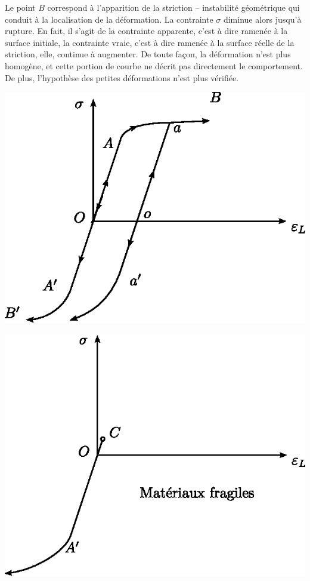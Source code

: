 Le point $B$ correspond à l'apparition de la striction -- instabilité géométrique qui conduit à la localisation de la déformation.
La contrainte $\sigma$ diminue alors jusqu'à rupture.
En fait, il s'agit de la contrainte apparente, c'est à dire ramenée à la surface initiale, la contrainte vraie, c'est à dire ramenée à la surface réelle de la striction, elle, continue à augmenter.
De toute façon, la déformation n'est plus homogène, et cette portion de courbe ne décrit pas directement le comportement.
De plus, l'hypothèse des petites déformations n'est plus vérifiée.
\begin{multicols}{2}
    \begin{center}
        \includegraphics{../images/T1_Ch04-0013}
    \end{center}
    \columnbreak
    \begin{center}
        \includegraphics{../images/T1_Ch04-0014}
    \end{center}
\end{multicols}
